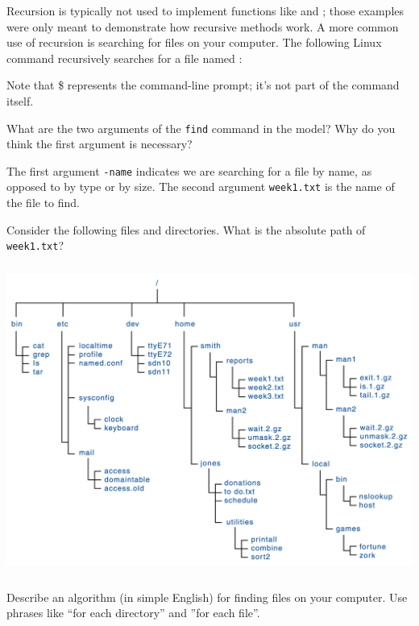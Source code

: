 
Recursion is typically not used to implement functions like  and ; those examples were only meant to demonstrate how recursive methods work.
A more common use of recursion is searching for files on your computer.
The following Linux command recursively searches for a file named :

\vspace{1em}
\vspace{1em}

Note that \$ represents the command-line prompt; it's not part of the command itself.




\Q What are the two arguments of the \texttt{find} command in the model?
Why do you think the first argument is necessary?

\begin{answer}
The first argument \texttt{-name} indicates we are searching for a file by name, as opposed to by type or by size. The second argument \texttt{week1.txt} is the name of the file to find.
\end{answer}


\Q Consider the following files and directories.
What is the absolute path of \texttt{week1.txt}?

\begin{center}
\includegraphics[height=4in]{unix-files.png}
\end{center}


\Q Describe an algorithm (in simple English) for finding files on your computer.
Use phrases like ``for each directory'' and ''for each file''.

